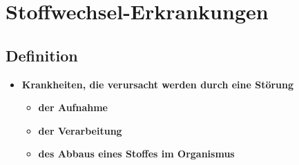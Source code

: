 \section{Stoffwechsel-Erkrankungen}
\subsection{Definition}
	\begin{itemize}
		\item \textbf{Krankheiten, die verursacht werden durch eine Störung}
			\begin{itemize}
				\item \textbf{der Aufnahme}
				\item \textbf{der Verarbeitung}
				\item \textbf{des Abbaus eines Stoffes im Organismus}
			\end{itemize}
	\end{itemize}
